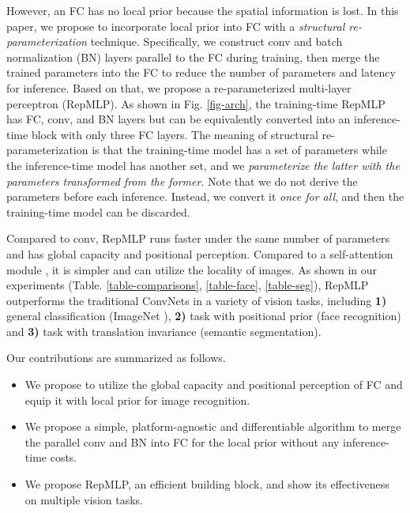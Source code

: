 \documentclass[10pt,twocolumn,letterpaper]{article}
\begin{document}
However, an FC has no local prior because the spatial information is lost. In this paper, we propose to incorporate local prior into FC with a \textit{structural re-parameterization} technique. Specifically, we construct conv and batch normalization (BN) \cite{ioffe2015batch} layers parallel to the FC during training, then merge the trained parameters into the FC to reduce the number of parameters and latency for inference. Based on that, we propose a re-parameterized multi-layer perceptron (RepMLP). As shown in Fig. \ref{fig-arch}, the training-time RepMLP has FC, conv, and BN layers but can be equivalently converted into an inference-time block with only three FC layers. The meaning of structural re-parameterization is that the training-time model has a set of parameters while the inference-time model has another set, and we \textit{parameterize the latter with the parameters transformed from the former}. Note that we do not derive the parameters before each inference. Instead, we convert it \textit{once for all}, and then the training-time model can be discarded.

Compared to conv, RepMLP runs faster under the same number of parameters and has global capacity and positional perception. Compared to a self-attention module \cite{wang2018non,dosovitskiy2020image}, it is simpler and can utilize the locality of images. As shown in our experiments (Table. \ref{table-comparisons}, \ref{table-face}, \ref{table-seg}), RepMLP outperforms the traditional ConvNets in a variety of vision tasks, including \textbf{1)} general classification (ImageNet \cite{deng2009imagenet}), \textbf{2)} task with positional prior (face recognition) and \textbf{3)} task with translation invariance (semantic segmentation).

Our contributions are summarized as follows.
\begin{itemize}[noitemsep,nolistsep,topsep=0pt,parsep=0pt,partopsep=0pt]
	\item We propose to utilize the global capacity and positional perception of FC and equip it with local prior for image recognition.
	\item We propose a simple, platform-agnostic and differentiable algorithm to merge the parallel conv and BN into FC for the local prior without any inference-time costs.
	\item We propose RepMLP, an efficient building block, and show its effectiveness on multiple vision tasks.
\end{itemize}
\end{document}
